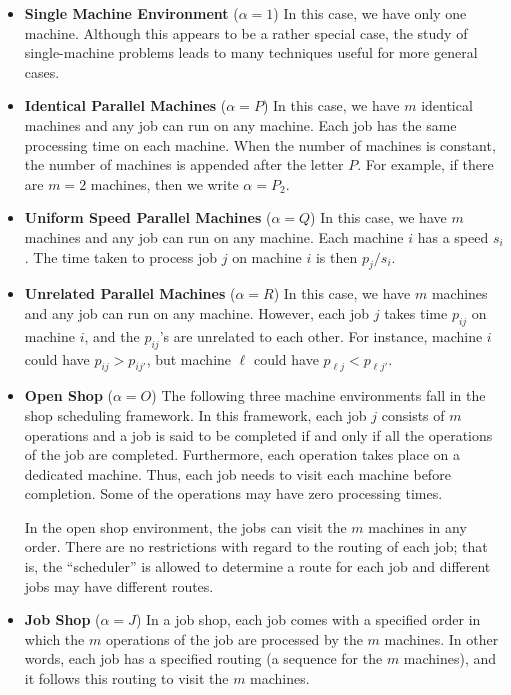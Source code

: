 \begin{itemize}

    \item {\bf Single Machine Environment} ($\alpha = 1$) In this case, we 
    have only one machine. Although this appears to be a rather special case, 
    the study of single-machine problems leads to many techniques useful for 
    more general cases.

    \item {\bf Identical Parallel Machines} ($\alpha = P$) In this case, we 
    have $m$ identical machines and any job can run on any machine. Each job 
    has the same processing time on each machine. When the number of machines 
    is constant, the number of machines is appended after the letter $P$.
    For example, if there are $m = 2$ machines, then we write $\alpha = P_2$.

    \item {\bf Uniform Speed Parallel Machines} ($\alpha = Q$) In this case, 
    we have $m$ machines and any job can run on any machine. Each machine 
    $i$ has a speed $s_i$. The time taken to process job $j$ on machine $i$ 
    is then $p_j/s_i$.

    \item {\bf Unrelated Parallel Machines} ($\alpha = R$) In this case, we 
    have $m$ machines and any job can run on any machine. However, each 
    job $j$ takes time $p_{ij}$ on machine $i$, and the $p_{ij}$'s are 
    unrelated to each other. For instance, machine $i$ could have 
    $p_{ij} > p_{ij'}$, but machine $\ell$ could have $p_{\ell j} < 
    p_{\ell j'}$. 

    \item {\bf Open Shop} ($\alpha = O$) The following three machine 
    environments fall in the shop scheduling framework. In this framework, 
    each job $j$ consists of $m$ operations and a job is said to be completed 
    if and only if all the operations of the job are completed. Furthermore, 
    each operation takes place on a dedicated machine. Thus, each job
    needs to visit each machine before completion. Some of the operations may 
    have zero processing times. 
    
    In the open shop environment, the jobs can 
    visit the $m$ machines in any order. There are no restrictions with regard 
    to the routing of each job; that is, the ``scheduler'' is allowed to 
    determine a route for each job and different jobs may have different routes.

    \item {\bf Job Shop} ($\alpha = J$) In a job shop, each job comes with a 
    specified order in which the $m$ operations of the job are processed by 
    the $m$ machines. In other words, each job has a specified routing 
    (a sequence for the $m$ machines), and it follows this routing to visit 
    the $m$ machines.


\end{itemize}
